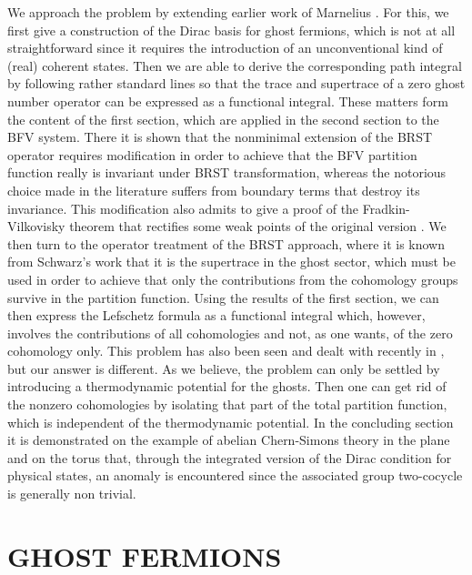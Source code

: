 \documentclass[a4paper,10pt]{article}
\begin{document}
We approach the problem by extending earlier work of Marnelius \cite{Marn 87}. For this, 
we first give a construction of the Dirac basis for ghost fermions, which is not at all 
straightforward since it requires the introduction of an unconventional kind of (real) 
coherent states. Then we are able to derive the corresponding path integral by following 
rather standard lines so that the trace and supertrace of a zero ghost number operator 
can be expressed as a functional integral. These matters form the content of the first 
section, which are applied in the second section to the BFV system. There it is shown 
that the nonminimal extension of the BRST operator requires modification in order to 
achieve that the BFV partition function really is invariant under BRST transformation, 
whereas the notorious choice made in the literature \cite{Frad 75,Henn 92} suffers from 
boundary terms \cite{Henn 85,Henn 92,Henn 92a} that destroy its invariance. This 
modification also admits to give a proof of the Fradkin-Vilkovisky \cite{Frad 75} theorem that 
rectifies some weak points of the original version \cite{Bata 77}. We then turn to the 
operator treatment of the BRST approach, where it is known from Schwarz's work \cite{Schw 
89} that it is the supertrace in the ghost sector, which must be used in order to achieve  
that only the contributions from the cohomology groups survive in the partition function.  
Using the results of the first section, we can then express the Lefschetz formula as a 
functional integral which, however, involves the contributions of all cohomologies and 
not, as one wants, of the zero cohomology only. This problem has also been seen and dealt 
with recently in \cite{Roge 97}, but our answer is different. As we believe, the problem 
can only be settled by introducing a thermodynamic potential for the ghosts. Then one can 
get rid of the nonzero cohomologies by isolating that part of the total partition 
function, which is independent of the thermodynamic potential. In the concluding section 
it is demonstrated on the example of abelian Chern-Simons theory in the plane and on the 
torus that, through the integrated version of the Dirac condition for physical states, an 
anomaly \cite{Trei 85} is encountered since the associated group two-cocycle is generally 
non trivial.

\section{GHOST FERMIONS}
\end{document}
